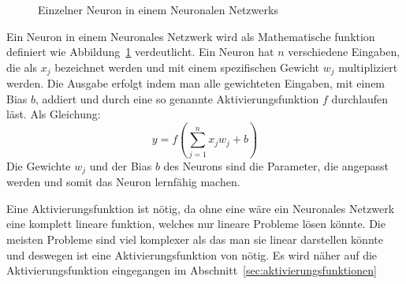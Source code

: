 \documentclass[12pt,a4paper]{report}
\begin{document}
\begin{figure}[h]
    \centering
{}
    \caption{Einzelner Neuron in einem Neuronalen Netzwerks}
    \label{fig:neuron1}
\end{figure}

Ein Neuron in einem Neuronales Netzwerk wird als Mathematische funktion definiert wie Abbildung~\ref{fig:neuron1}
verdeutlicht.
Ein Neuron hat $n$ verschiedene Eingaben, die als $x_j$ bezeichnet werden und mit einem spezifischen Gewicht $w_j$ multipliziert werden.
Die Ausgabe erfolgt indem man alle gewichteten Eingaben, mit einem Bias $b$, addiert und durch eine so genannte
Aktivierungsfunktion $f$ durchlaufen läst.
Als Gleichung:
\[y =f\left(\sum_{j=1}^{n} x_j w_j + b\right)\]
Die Gewichte $w_j$ und der Bias $b$ des Neurons sind die Parameter, die angepasst werden und somit das Neuron lernfähig machen.

Eine Aktivierungsfunktion ist nötig, da ohne eine wäre ein Neuronales Netzwerk eine komplett lineare funktion, welches
nur lineare Probleme lösen könnte.\cite{activations}
Die meisten Probleme sind viel komplexer als das man sie linear darstellen könnte und deswegen ist eine Aktivierungsfunktion von nötig.
Es wird näher auf die Aktivierungsfunktion eingegangen im Abschnitt~\ref{sec:aktivierungsfunktionen}
\end{document}
